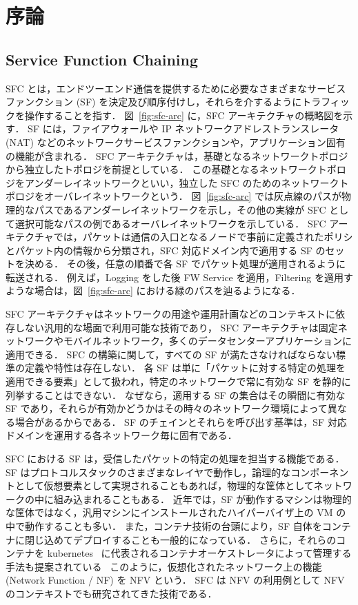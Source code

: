 \chapter{序論}
\label{chap:introduction}
\section{Service Function Chaining}
\label{section:sfc}

SFC とは，エンドツーエンド通信を提供するために必要なさまざまなサービスファンクション (SF) を決定及び順序付けし，それらを介するようにトラフィックを操作することを指す．
図~\ref{fig:sfc-arc} に，SFC アーキテクチャの概略図を示す．
SF には，ファイアウォールや IP ネットワークアドレストランスレータ (NAT) などのネットワークサービスファンクションや，アプリケーション固有の機能が含まれる．
SFC アーキテクチャは，基礎となるネットワークトポロジから独立したトポロジを前提としている．
この基礎となるネットワークトポロジをアンダーレイネットワークといい，独立した SFC のためのネットワークトポロジをオーバレイネットワークという．
図~\ref{fig:sfc-arc} では灰点線のパスが物理的なパスであるアンダーレイネットワークを示し，その他の実線が SFC として選択可能なパスの例であるオーバレイネットワークを示している．
SFC アーキテクチャでは，パケットは通信の入口となるノードで事前に定義されたポリシとパケット内の情報から分類され，SFC 対応ドメイン内で適用する SF のセットを決める．
その後，任意の順番で各 SF でパケット処理が適用されるように転送される．
例えば，Logging をした後 FW Service を適用，Filtering を適用すような場合は，図~\ref{fig:sfc-arc} における緑のパスを辿るようになる．

SFC アーキテクチャはネットワークの用途や運用計画などのコンテキストに依存しない汎用的な場面で利用可能な技術であり，
SFC アーキテクチャは固定ネットワークやモバイルネットワーク，多くのデータセンターアプリケーションに適用できる．
SFC の構築に関して，すべての SF が満たさなければならない標準の定義や特性は存在しない．
各 SF は単に「パケットに対する特定の処理を適用できる要素」として扱われ，特定のネットワークで常に有効な SF を静的に列挙することはできない．
なぜなら，適用する SF の集合はその瞬間に有効な SF であり，それらが有効かどうかはその時々のネットワーク環境によって異なる場合があるからである．
SF のチェインとそれらを呼び出す基準は，SF 対応ドメインを運用する各ネットワーク毎に固有である．

SFC における SF は，受信したパケットの特定の処理を担当する機能である．
SF はプロトコルスタックのさまざまなレイヤで動作し，論理的なコンポーネントとして仮想要素として実現されることもあれば，物理的な筐体としてネットワークの中に組み込まれることもある．
近年では，SF が動作するマシンは物理的な筐体ではなく，汎用マシンにインストールされたハイパーバイザ上の VM の中で動作することも多い．
また，コンテナ技術の台頭により，SF 自体をコンテナに閉じ込めてデプロイすることも一般的になっている．
さらに，それらのコンテナを kubernetes~\cite{k8s} に代表されるコンテナオーケストレータによって管理する手法も提案されている~\cite{sfc-with-k8s}
このように，仮想化されたネットワーク上の機能 (Network Function / NF) を NFV という．
SFC は NFV の利用例として NFV のコンテキストでも研究されてきた技術である．

